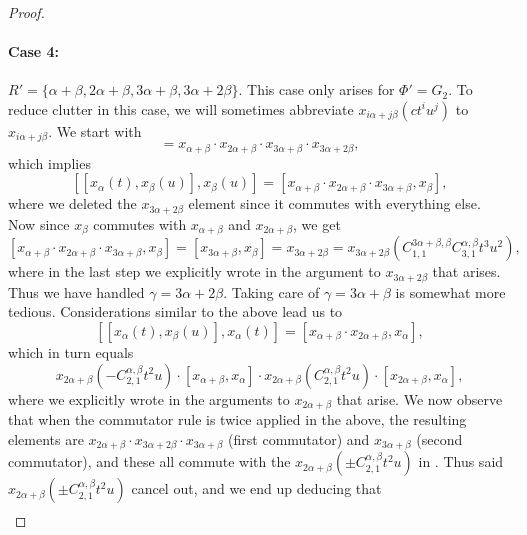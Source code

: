 \documentclass[11pt]{article}
\begin{document}
\begin{proof}
    \paragraph{Case 4:} $R' = \{\alpha+\beta, 2\alpha+\beta,3\alpha+\beta, 3\alpha+2\beta\}$. This case only arises for $\Phi' = G_2$.   To reduce clutter in this case, we will sometimes abbreviate $x_{i\alpha+j\beta}(c t^i u^j)$ to $x_{i\alpha+j\beta}$.
    We start with
    \begin{equation}
        [x_\alpha(t),x_\beta(u)] = x_{\alpha+\beta} \cdot x_{2\alpha+\beta} \cdot x_{3\alpha+\beta} \cdot x_{3\alpha+2\beta},  \label{eqn:ugh0} 
    \end{equation}
    which  implies
    \[
        [[x_\alpha(t), x_\beta(u)], x_\beta(u)] = 
        [ x_{\alpha+\beta}\cdot x_{2\alpha+\beta}\cdot x_{3\alpha+\beta}, x_\beta ], 
    \]
    where we deleted the $x_{3\alpha+2\beta}$ element since it commutes with everything else.  Now since $x_\beta$ commutes with $x_{\alpha+\beta}$ and $x_{2\alpha+\beta}$, we get 
    \[
        [ x_{\alpha+\beta}\cdot x_{2\alpha+\beta}\cdot x_{3\alpha+\beta}, x_\beta ] = [x_{3\alpha+\beta},x_\beta] = x_{3\alpha+2\beta} = x_{3\alpha+2\beta}(C_{1,1}^{3\alpha+\beta,\beta} C_{3,1}^{\alpha,\beta} t^3 u^2),
    \]
    where in the last step we explicitly wrote in the argument to $x_{3\alpha+2\beta}$ that arises.  Thus we have  handled $\gamma = 3\alpha + 2\beta$.  Taking care of $\gamma = 3\alpha + \beta$ is somewhat more tedious.  Considerations similar to the above lead us to 
    \[
        [[x_\alpha(t), x_\beta(u)], x_\alpha(t)] = 
        [ x_{\alpha+\beta}\cdot x_{2\alpha+\beta}, x_\alpha ],
    \]
    which in turn equals
    \begin{equation}    \label{eqn:ugh1}
        x_{2\alpha+\beta}(-C_{2,1}^{\alpha,\beta} t^2 u) \cdot [x_{\alpha+\beta},x_\alpha]\cdot x_{2\alpha+\beta}(C_{2,1}^{\alpha,\beta} t^2 u) \cdot [x_{2\alpha+\beta},x_\alpha],
    \end{equation}
    where we explicitly wrote in the arguments to $x_{2\alpha+\beta}$ that arise.  We now observe that when the commutator rule is twice applied in the above, the resulting elements are $x_{2\alpha+\beta} \cdot x_{3\alpha+2\beta} \cdot x_{3\alpha+\beta}$ (first commutator) and $x_{3\alpha+\beta}$ (second commutator), and these all commute with the $x_{2\alpha+\beta}(\pm C_{2,1}^{\alpha,\beta} t^2 u)$ in .  Thus said $x_{2\alpha+\beta}(\pm C_{2,1}^{\alpha,\beta} t^2 u)$ cancel out, and we end up deducing that 
    \begin{multline}    \label{eqn:ugh2}

\end{multline}
\end{proof}
\end{document}
